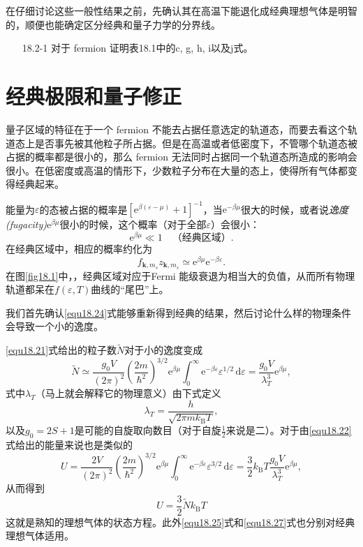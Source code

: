 在仔细讨论这些一般性结果之前，先确认其在高温下能退化成经典理想气体是明智的，顺便也能确定区分经典和量子力学的分界线。

\begin{itemize}
\item[18.2-1] 对于 fermion 证明表18.1中的c, g, h, i以及j式。
\end{itemize}

\section{经典极限和量子修正}\label{sec18.3}
量子区域的特征在于一个 fermion 不能去占据任意选定的轨道态，而要去看这个轨道态上是否事先被其他粒子所占据。但是在高温或者低密度下，不管哪个轨道态被占据的概率都是很小的，那么 fermion 无法同时占据同一个轨道态所造成的影响会很小。在低密度或高温的情形下，少数粒子分布在大量的态上，使得所有气体都变得经典起来。

能量为$\varepsilon$的态被占据的概率是$[\mathrm e^{\beta(\varepsilon-\mu)}+1]^{-1}$，当$\mathrm e^{-\beta\mu}$很大的时候，或者说{\it 逸度(fugacity)}$\mathrm e^{\beta\mu}$很小的时候，这个概率（对于全部$\varepsilon$）会很小：
\begin{equation}
\mathrm e^{\beta\mu} \ll 1 \quad\text{（经典区域）}.
\end{equation}
在经典区域中，相应的概率约化为
\begin{equation}
f_{{\mathbf k},m_s}z_{{\mathbf k},m_s}\simeq\mathrm e^{\beta\mu}\mathrm e^{-\beta\varepsilon}.
\label{equ18.24}
\end{equation}
在图\ref{fig18.1}中，，经典区域对应于Fermi 能级衰退为相当大的负值，从而所有物理轨道都呆在$f(\varepsilon,T)$曲线的``尾巴''上。

我们首先确认\eqref{equ18.24}式能够重新得到经典的结果，然后讨论什么样的物理条件会导致一个小的逸度。

\eqref{equ18.21}式给出的粒子数$\tilde N$对于小的逸度变成
\begin{equation}
\tilde N\simeq\frac{g_0V}{(2\pi)^2}\left(\frac{2m}{\hbar^2}\right)^{3/2}\mathrm e^{\beta\mu}\int_0^\infty\mathrm e^{-\beta\varepsilon}\varepsilon^{1/2}\,\mathrm d\varepsilon=\frac{g_0V}{\lambda_T^3}\mathrm e^{\beta\mu},
\label{equ18.25}
\end{equation}
式中$\lambda_T$（马上就会解释它的物理意义）由下式定义
\begin{equation}
\lambda_T=\frac{h}{\sqrt{2\pi mk_\text{B}T}},
\label{equ18.26}
\end{equation}
以及$g_0=2S+1$是可能的自旋取向数目（对于自旋$\frac{1}{2}$来说是二）。对于由\eqref{equ18.22}式给出的能量来说也是类似的
\begin{equation}
U=\frac{2V}{(2\pi)^2}\left(\frac{2m}{\hbar^2}\right)^{3/2}\mathrm e^{\beta\mu}\int_0^\infty\mathrm e^{-\beta\varepsilon}\varepsilon^{3/2}\,\mathrm d\varepsilon=\frac{3}{2}k_\text{B}T\frac{g_0V}{\lambda_T^3}\mathrm e^{\beta\mu},
\label{equ18.27}
\end{equation}
从而得到
\begin{equation}
U=\frac{3}{2}\tilde Nk_\text{B}T
\end{equation}
这就是熟知的理想气体的状态方程。此外\eqref{equ18.25}式和\eqref{equ18.27}式也分别对经典理想气体适用。

